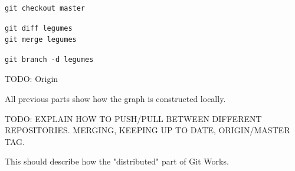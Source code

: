 \documentclass[table,tikz,12pt,svgnames]{beamer}
\begin{document}
\begin{frame}[fragile]
{\begin{figure}
\begin{subfigure}[h]{\textwidth}
\begin{tikzpicture}
			\end{tikzpicture}
		\end{subfigure}
	\end{figure}
}
\vspace{0.4cm} \begin{center} \noindent{} \end{center} \vspace{-0.4cm}

\begin{verbatim}
git checkout master
\end{verbatim}
\pause[2]
\begin{verbatim}
git diff legumes
git merge legumes
\end{verbatim}
\pause
\begin{verbatim}
git branch -d legumes
\end{verbatim}
\end{frame}



\begin{frame}{TODO: Origin}

All previous parts show how the graph is constructed locally.

TODO: EXPLAIN HOW TO PUSH/PULL BETWEEN DIFFERENT REPOSITORIES.
MERGING, KEEPING UP TO DATE, ORIGIN/MASTER TAG.

This should describe how the "distributed" part of Git Works.

\end{frame}




\end{document}
